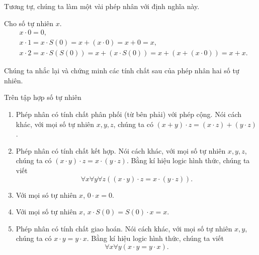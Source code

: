 Tương tự, chúng ta làm một vài phép nhân với định nghĩa này.

\begin{example}
    Cho số tự nhiên $x$.
    \begin{align*}
         & x \cdot 0 = 0,                                                                 \\
         & x \cdot 1 = x\cdot S(0) = x + (x\cdot 0) = x + 0 = x,                          \\
         & x \cdot 2 = x\cdot S(S(0)) = x + (x\cdot S(0)) = x + (x + (x\cdot 0)) = x + x.
    \end{align*}
\end{example}

Chúng ta nhắc lại và chứng minh các tính chất sau của phép nhân hai số tự nhiên.

\begin{theorem}\label{theorem:property-of-natural-numbers-multiplication}
    Trên tập hợp số tự nhiên
    \begin{enumerate}[label={(\roman*)}]
        \item Phép nhân có tính chất phân phối (từ bên phải) với phép cộng. Nói cách khác, với mọi số tự nhiên $x, y, z$, chúng ta có $(x + y)\cdot z = (x\cdot z) + (y\cdot z)$.
        \item Phép nhân có tính chất kết hợp. Nói cách khác, với mọi số tự nhiên $x, y, z$, chúng ta có $(x \cdot y) \cdot z = x \cdot (y \cdot z)$. Bằng kí hiệu logic hình thức, chúng ta viết
              \[
                  \forall x\forall y\forall z \left( (x \cdot y) \cdot z = x \cdot (y \cdot z) \right).
              \]
        \item Với mọi só tự nhiên $x$, $0\cdot x = 0$.
        \item Với mọi số tự nhiên $x$, $x\cdot S(0) = S(0) \cdot x = x$.
        \item Phép nhân có tính chất giao hoán. Nói cách khác, với mọi số tự nhiên $x, y$, chúng ta có $x \cdot y = y \cdot x$. Bằng kí hiệu logic hình thức, chúng ta viết
              \[
                  \forall x\forall y \left( x \cdot y = y \cdot x \right).
              \]
    \end{enumerate}
\end{theorem}

